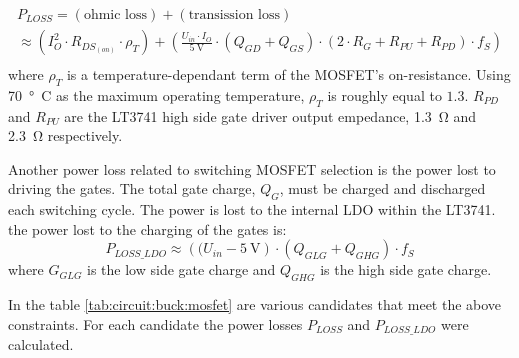 \begin{multline}
    P_{LOSS} = (\textrm{ohmic loss}) + (\textrm{transission loss}) \\
             \approx \left( I_O^2 \cdot R_{DS_{(on)}} \cdot \rho_T \right)
                    + \left( \frac{U_{in} \cdot I_O}{\SI{5}{\volt}} \cdot \left(Q_{GD} + Q_{GS} \right) \cdot \left( 2 \cdot R_G + R_{PU} + R_{PD} \right) \cdot f_S \right) \\
    \label{eq:circuit:buck:mosfet_ploss}
\end{multline}
where  $\rho_T$ is a temperature-dependant term of the  MOSFET's  on-resistance.
Using \SI{70}{\degree C} as the maximum operating temperature, $\rho_T$ is
roughly  equal  to  $1.3$.  $R_{PD}$  and $R_{PU}$ are the LT3741 high side gate
driver   output   empedance,  \SI{1.3}{\ohm}  and  \SI{2.3}{\ohm}  respectively.

Another power loss related to switching MOSFET selection  is  the  power lost to
driving the gates. The total gate  charge, $Q_G$, must be charged and discharged
each switching cycle. The power is lost to the  internal  LDO within the LT3741.
the power lost to the charging of the gates is:
\begin{equation}
    P_{LOSS\_LDO} \approx \left( (U_{in} - \SI{5}{\volt} \right) \cdot \left( Q_{GLG} + Q_{GHG} \right) \cdot f_S
    \label{eq:circuit:buck:switching_loss}
\end{equation}
where $G_{GLG}$ is the low side gate charge  and $Q_{GHG}$ is the high side gate
charge.

In the table \ref{tab:circuit:buck:mosfet} are various candidates  that meet the
above  constraints.  For   each   candidate  the  power  losses  $P_{LOSS}$  and
$P_{LOSS\_LDO}$ were calculated.

